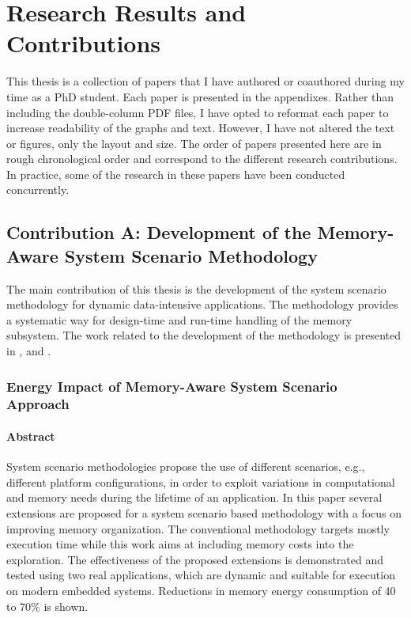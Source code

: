 \chapter{Research Results and Contributions}
\label{research}

This thesis is a collection of papers that I have authored or coauthored during my time as a PhD student. 
Each paper is presented in the appendixes. 
Rather than including the double-column PDF files, I have opted to reformat each paper to increase readability of the graphs and text. 
However, I have not altered the text or figures, only the layout and size.
The order of papers presented here are in rough chronological order and correspond to the different research contributions. 
In practice, some of the research in these papers have been conducted concurrently.

\section{Contribution A: Development of the Memory-Aware System Scenario Methodology}

The main contribution of this thesis is the development of the system scenario methodology for dynamic data-intensive applications.
The methodology provides a systematic way for design-time and run-time handling of the memory subsystem.
The work related to the development of the methodology is presented in \cite{Fil12}, \cite{filippopoulos2013exploration} and \cite{zompakis2014systematic}.

\subsection{Energy Impact of Memory-Aware System Scenario Approach}

\subsubsection{Abstract}

System scenario methodologies propose the use of different scenarios, e.g., different platform configurations, in order to exploit variations in computational and memory needs during the lifetime of an application. In this paper several extensions are proposed for a system scenario based methodology with a focus on improving memory organization. The conventional methodology targets mostly execution time while this work aims at including memory costs into the exploration. The effectiveness of the proposed extensions is demonstrated and tested using two real applications, which are dynamic and suitable for execution on modern embedded systems. Reductions in memory energy consumption of 40 to 70\% is shown.

